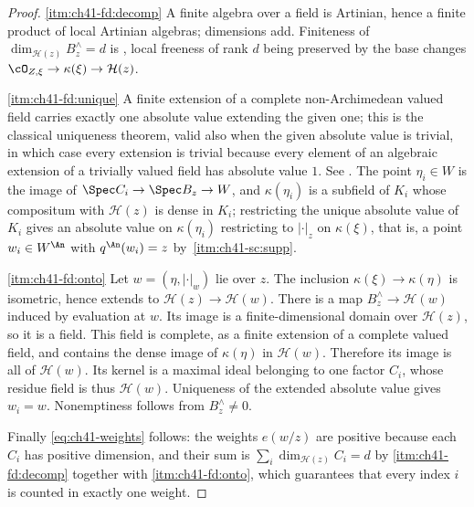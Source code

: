 \begin{proof}
\cref{itm:ch41-fd:decomp}  A finite algebra over a field is Artinian, hence a
finite product of local Artinian algebras; dimensions add.  Finiteness of
$\dim_{\mathcal H(z)}B_z^{\wedge}=d$ is
, local freeness of rank $d$ being preserved
by the base changes $\cO_{Z,\xi}\to\kappa(\xi)\to\mathcal H(z)$.

\cref{itm:ch41-fd:unique}  A finite extension of a complete non-Archimedean
valued field carries exactly one absolute value extending the given one;
this is the classical uniqueness theorem, valid also when the given absolute
value is trivial, in which case every extension is trivial because every
element of an algebraic extension of a trivially valued field has absolute
value $1$.  See \cite[Chapter~VI, \S11]{ZariskiSamuelII}.  The point
$\eta_i\in W$ is the image of $\Spec C_i\to\Spec B_z\to W$, and
$\kappa(\eta_i)$ is a subfield of $K_i$ whose compositum with
$\mathcal H(z)$ is dense in $K_i$; restricting the unique absolute value
of $K_i$ gives an absolute value on $\kappa(\eta_i)$ restricting to
$|\cdot|_z$ on $\kappa(\xi)$, that is, a point $w_i\in W^{\An}$ with
$q^{\An}(w_i)=z$ by
\,\cref{itm:ch41-sc:supp}.

\cref{itm:ch41-fd:onto}  Let $w=(\eta,|\cdot|_w)$ lie over $z$.
The inclusion $\kappa(\xi)\to\kappa(\eta)$ is isometric, hence
extends to $\mathcal H(z)\to\mathcal H(w)$.
There is a map
$B_z^\wedge\to\mathcal H(w)$ induced by evaluation at $w$.
Its image is a finite-dimensional domain over $\mathcal H(z)$,
so it is a field.  This field is complete, as a finite extension
of a complete valued field, and contains the dense image of
$\kappa(\eta)$ in $\mathcal H(w)$.  Therefore its image is all
of $\mathcal H(w)$.  Its kernel is a maximal ideal belonging to
one factor $C_i$, whose residue field is thus $\mathcal H(w)$.
Uniqueness of the extended absolute value gives $w_i=w$.
Nonemptiness follows from $B_z^\wedge\ne0$.

Finally \eqref{eq:ch41-weights} follows: the weights $e(w/z)$ are positive
because each $C_i$ has positive dimension, and their sum is
$\sum_i\dim_{\mathcal H(z)}C_i=d$ by \cref{itm:ch41-fd:decomp} together
with \cref{itm:ch41-fd:onto}, which guarantees that every index $i$ is
counted in exactly one weight.
\end{proof}

